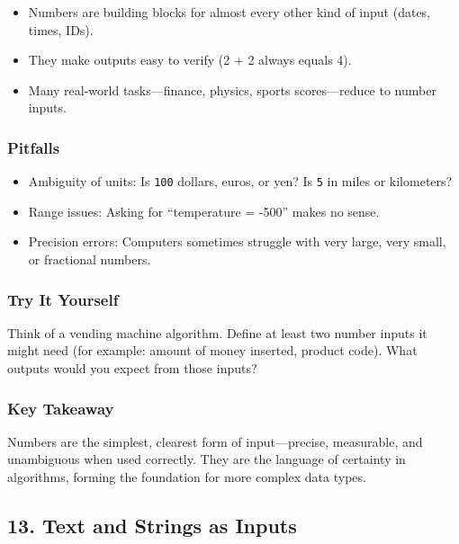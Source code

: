 \documentclass[
  letterpaper,
  DIV=11,
  numbers=noendperiod]{scrreprt}
\providecommand{\tightlist}{%
  \setlength{\itemsep}{0pt}\setlength{\parskip}{0pt}}
\begin{document}
\begin{itemize}
\tightlist
\item
  Numbers are building blocks for almost every other kind of input
  (dates, times, IDs).
\item
  They make outputs easy to verify (2 + 2 always equals 4).
\item
  Many real-world tasks---finance, physics, sports scores---reduce to
  number inputs.
\end{itemize}

\subsubsection{Pitfalls}\label{pitfalls-8}

\begin{itemize}
\tightlist
\item
  Ambiguity of units: Is \texttt{100} dollars, euros, or yen? Is
  \texttt{5} in miles or kilometers?
\item
  Range issues: Asking for ``temperature = -500'' makes no sense.
\item
  Precision errors: Computers sometimes struggle with very large, very
  small, or fractional numbers.
\end{itemize}

\subsubsection{Try It Yourself}\label{try-it-yourself-11}

Think of a vending machine algorithm. Define at least two number inputs
it might need (for example: amount of money inserted, product code).
What outputs would you expect from those inputs?

\subsubsection{Key Takeaway}\label{key-takeaway-10}

Numbers are the simplest, clearest form of input---precise, measurable,
and unambiguous when used correctly. They are the language of certainty
in algorithms, forming the foundation for more complex data types.

\subsection{13. Text and Strings as
Inputs}\label{text-and-strings-as-inputs}
\end{document}
